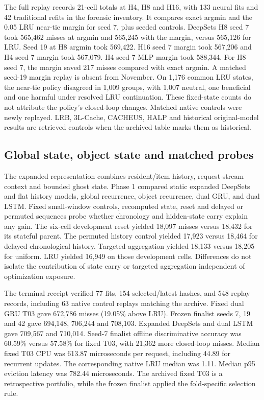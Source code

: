 \documentclass[11pt,letterpaper]{article}
\begin{document}
The full replay records 21-cell totals at H4, H8 and H16, with 133 neural fits and 42 traditional refits in the forensic inventory. It compares exact argmin and the 0.05 LRU near-tie margin for seed 7, plus seeded controls. DeepSets H8 seed 7 took 565,462 misses at argmin and 565,245 with the margin, versus 565,126 for LRU. Seed 19 at H8 argmin took 569,422. H16 seed 7 margin took 567,206 and H4 seed 7 margin took 567,079. H4 seed-7 MLP margin took 588,344. For H8 seed 7, the margin saved 217 misses compared with exact argmin. A matched seed-19 margin replay is absent from November. On 1,176 common LRU states, the near-tie policy disagreed in 1,009 groups, with 1,007 neutral, one beneficial and one harmful under resolved LRU continuation. These fixed-state counts do not attribute the policy's closed-loop changes. Matched native controls were newly replayed. LRB, 3L-Cache, CACHEUS, HALP and historical original-model results are retrieved controls when the archived table marks them as historical.

\subsection{Global state, object state and matched probes}
The expanded representation combines resident/item history, request-stream context and bounded ghost state. Phase 1 compared static expanded DeepSets and flat history models, global recurrence, object recurrence, dual GRU, and dual LSTM. Fixed small-window controls, recomputed state, reset and delayed or permuted sequences probe whether chronology and hidden-state carry explain any gain. The six-cell development reset yielded 18,097 misses versus 18,432 for its stateful parent. The permuted history control yielded 17,923 versus 18,464 for delayed chronological history. Targeted aggregation yielded 18,133 versus 18,205 for uniform. LRU yielded 16,949 on those development cells. Differences do not isolate the contribution of state carry or targeted aggregation independent of optimization exposure.

The terminal receipt verified 77 fits, 154 selected/latest hashes, and 548 replay records, including 63 native control replays matching the archive. Fixed dual GRU T03 gave 672,786 misses (19.05\% above LRU). Frozen finalist seeds 7, 19 and 42 gave 694,148, 706,244 and 708,103. Expanded DeepSets and dual LSTM gave 709,567 and 710,014. Seed-7 finalist offline discriminative accuracy was 60.59\% versus 57.58\% for fixed T03, with 21,362 more closed-loop misses. Median fixed T03 CPU was 613.87 microseconds per request, including 44.89 for recurrent updates. The corresponding native LRU median was 1.11. Median p95 eviction latency was 782.44 microseconds. The archived fixed T03 is a retrospective portfolio, while the frozen finalist applied the fold-specific selection rule.
\end{document}
